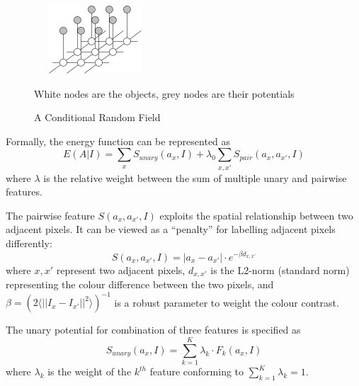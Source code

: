 \documentclass[10pt,twocolumn,letterpaper]{article}
\newcommand{\SUM}{\sum\limits}
\begin{document}
\begin{figure}
    \begin{center}
        \includegraphics[width=1.8in,height=1in]{./Figures/mrf.jpg} \\
        \caption{A Conditional Random Field }\small White nodes are the objects, grey nodes are their potentials
        \end{center}
\end{figure}

Formally, the energy function can be represented as $$E(A|I) = \SUM_x S_{unary}(a_x,I) + \lambda_0 \SUM_{x,x'}S_{pair}(a_x,a_{x'},I)$$ where $\lambda$ is the relative weight between the sum of multiple unary  and pairwise features. 

The pairwise feature $S(a_x,a_{x'},I)$ exploits the spatial relationship between two adjacent pixels.  It can be viewed as a ``penalty'' for labelling adjacent pixels differently: $$S(a_x,a_{x'},I) = |a_x-a_{x'}| \cdot e^{-\beta d_{x,x'}}$$ where $x,x'$ represent two adjacent pixels, $d_{x,x'}$ is the L2-norm (standard norm) representing the colour difference between the two pixels, and $\beta=(2\langle||I_x-I_{x'}||^2\rangle)^{-1}$ is a robust parameter to weight the colour contrast.

The unary potential for combination of three features is specified as $$S_{unary}(a_x,I) = \SUM_{k=1}^K \lambda_k \cdot F_k(a_x,I)$$ where $\lambda_k$ is the weight of the $k^{th}$ feature conforming to $\sum_{k=1}^{K} \lambda_k = 1$.
\end{document}

